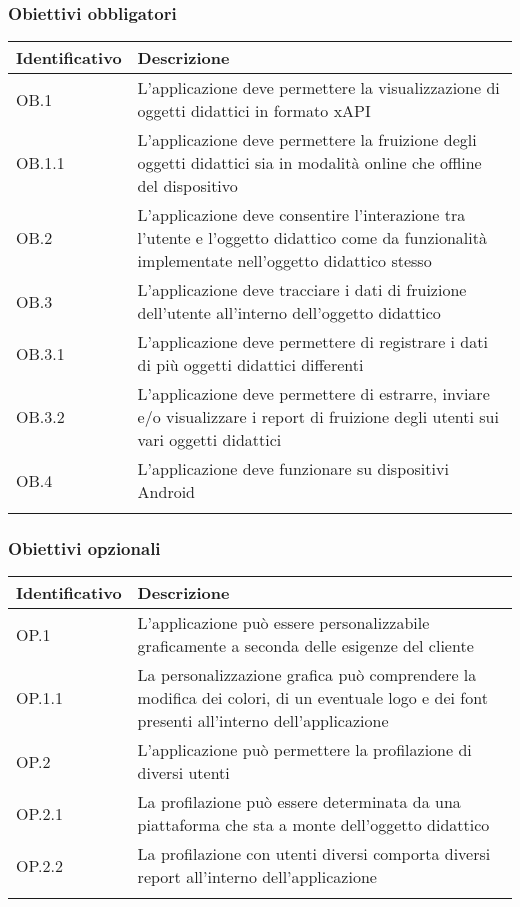 \documentclass[../Tesi.tex]{subfiles}
\begin{document}
		\subsubsection{Obiettivi obbligatori}
			\begin{longtabu} to \textwidth {X[0.3cm] X}
				\toprule
				\textbf{Identificativo} & \textbf{Descrizione} \\
				\midrule
				\endhead
				OB.1 & L’applicazione deve permettere la visualizzazione di oggetti didattici in formato xAPI \\
				\midrule
				OB.1.1 & L’applicazione deve permettere la fruizione degli oggetti didattici sia in modalità online che offline del dispositivo \\
				\midrule
				OB.2 & L’applicazione deve consentire l’interazione tra l’utente e l’oggetto didattico come da funzionalità implementate nell’oggetto didattico stesso \\
				\midrule
				OB.3 & L’applicazione deve tracciare i dati di fruizione dell’utente all’interno dell’oggetto didattico \\
				\midrule
				OB.3.1 & L’applicazione deve permettere di registrare i dati di più oggetti didattici differenti \\
				\midrule
				OB.3.2 & L’applicazione deve permettere di estrarre, inviare e/o visualizzare i report di fruizione degli utenti sui vari oggetti didattici \\
				\midrule
				OB.4 & L’applicazione deve funzionare su dispositivi Android \\
				\bottomrule
			\end{longtabu}

			\subsubsection{Obiettivi opzionali}
			\begin{longtabu} to \textwidth {X[0.3cm] X}
				\toprule
				\textbf{Identificativo} & \textbf{Descrizione} \\
				\midrule
				\endhead
				OP.1 & L’applicazione può essere personalizzabile graficamente a seconda delle esigenze del cliente  \\
				\midrule
				OP.1.1 \label{op1.1} & La personalizzazione grafica può comprendere la modifica dei colori, di un eventuale logo e dei font presenti all’interno dell’applicazione  \\
				\midrule
				OP.2 & L’applicazione può permettere la profilazione di diversi utenti  \\
				\midrule
				OP.2.1 & La profilazione può essere determinata da una piattaforma che sta a monte dell’oggetto didattico  \\
				\midrule
				OP.2.2 & La profilazione con utenti diversi comporta diversi report all’interno dell’applicazione \\
				\bottomrule
			\end{longtabu}
\end{document}
